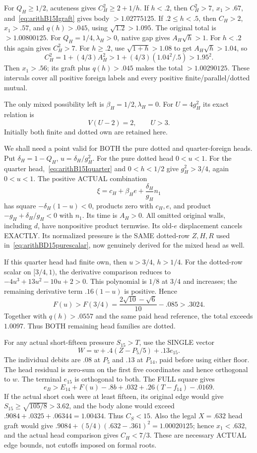 \documentclass[11pt]{article}
\begin{document}
For \(Q_H\ge1/2\), acuteness gives
\(C_H^2\ge2+1/h\).
If \(h<.2\), then \(C_H^2>7\), \(x_1>.67\),
and~\eqref{eq:arithB15Igraft} gives body \(>1.02775125\).
If \(.2\le h<.5\), then \(C_H>2\), \(x_1>.57\),
and \(q(h)>.045\), using \(\sqrt{1.2}>1.095\).
The original total is \(>1.00800125\).
For \(Q_H=1/4,\lambda_H>0\), native gap gives
\(A_H\sqrt h>1\).
For \(h<.2\) this again gives \(C_H^2>7\).
For \(h\ge.2\), use \(\sqrt{1+h}>1.08\) to get
\(A_H\sqrt h>1.04\), so
\[
 C_H^2=1+(4/3)A_H^2>
             1+(4/3)(1.04^2/.5)>1.95^2.
\]
Then \(x_1>.56\); its graft plus \(q(h)>.045\)
makes the total \(>1.00290125\).
These intervals cover all positive foreign labels
and every positive finite/parallel/dotted mutual.

The only mixed possibility left is
\(\beta_H=1/2,\lambda_H=0\).
For \(U=4g_H^2\) its exact relation is
\[
                           V(U-2)=2,\qquad U>3 .
\tag{BQ}\label{eq:arithB15Iquarter}
\]
Initially both finite and dotted own are retained here.

We shall need a point valid for BOTH the pure dotted
and quarter-foreign heads.
Put \(\delta_H=1-Q_H\), \(u=\delta_H/g_H^2\).
For the pure dotted head \(0<u<1\).
For the quarter head,~\eqref{eq:arithB15Iquarter}
and \(0<h<1/2\) give \(g_H^2>3/4\), again \(0<u<1\).
The positive ACTUAL combination
\[
             \xi=c_H+\beta_H e+{\frac{\delta_H}{g_H}}n_1
\]
has square \(-\delta_H(1-u)<0\), products zero
with \(c_H,e\), and product
\(-g_H+\delta_H/g_H<0\) with \(n_1\).
Its time is \(A_H>0\).
All omitted original walls, including \(d\), have
nonpositive product termwise.
Its old-\(e\) displacement cancels EXACTLY.
Its normalized pressure is the SAME dotted-row
\(Z,H,R\) used in~\eqref{eq:arithBD15purescalar},
now genuinely derived for the mixed head as well.

If this quarter head had finite own, then
\(u>3/4\), \(h>1/4\).
For the dotted-row scalar on \([3/4,1)\),
the derivative comparison reduces to
\(-4u^3+13u^2-10u+2>0\).
This polynomial is \(1/8\) at \(3/4\) and increases;
the remaining derivative term \(.16(1-u)\) is positive.
Hence
\[
 F(u)>F(3/4)={\frac{2\sqrt{10}-\sqrt6}{10}}-.085>.3024.
\]
Together with \(q(h)>.0557\) and the same paid
head reference, the total exceeds \(1.0097\).
Thus BOTH remaining head families are dotted.

For any actual short-fifteen pressure \(S_{15}>T\),
use the SINGLE vector
\[
                  W=w+.4(Z-P_5/5)+.13e_{15}.
\]
The individual debits are \(.08\) at \(P_5\) and
\(.13\) at \(P_{14}\), paid before using either floor.
The head residual is zero-sum on the first five
coordinates and hence orthogonal to \(w\).
The terminal \(e_{15}\) is orthogonal to both.
The FULL square gives
\[
 e_B>E_{14}+F(u)-.8b+.032
                    +.26(T-f_{14})-.0169 .
\tag{BT}\label{eq:arithB15Ijoint}
\]
If the actual short cosh were at least fifteen,
its original edge would give
\(S_{15}\ge\sqrt{105/8}>3.62\),
and the body alone would exceed
\(.9084+.0325+.06344=1.00434\).
Thus \(C_S<15\).
Also the legal \(X=.632\) head graft would give
\(.9084+(5/4)(.632-.361)^2=1.00020125\);
hence \(x_1<.632\), and the actual head comparison
gives \(C_H<7/3\).
These are necessary ACTUAL edge bounds, not cutoffs
imposed on formal roots.
\end{document}
